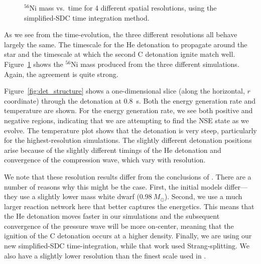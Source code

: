 \documentclass[preprint,linenumbers]{aastex631}
\newcommand{\isot}[2]{$^{#2}\mathrm{#1}$}
\begin{document}

\begin{figure}[t]
\centering
{}
\caption{\label{fig:res} \isot{Ni}{56} mass vs.\ time for 4 different spatial resolutions, using the simplified-SDC time integration method.}
\end{figure}

As we see from the time-evolution, the three different resolutions all
behave largely the same.  The timescale for the He detonation to
propagate around the star and the timescale at which the second C
detonation ignite match well.  Figure~\ref{fig:res} shows the
\isot{Ni}{56} mass produced from the three different simulations.
Again, the agreement is quite strong.



\begin{figure*}
\centering
{}
\caption{\label{fig:det_structure} Structure of the
C detonation at $t = 0.8~\mathrm{s}$ for the 3 different resolution runs.}
\end{figure*}

Figure~\ref{fig:det_structure} shows a one-dimensional
slice (along the horizontal, $r$ coordinate) through the detonation at 0.8~s.  Both the energy generation
rate and temperature are shown.  For the energy generation
rate, we see both positive and negative regions, indicating that we are attempting to find the NSE state as we evolve.  The temperature plot shows that the detonation
is very steep, particularly for the highest-resolution
simulations.  The slightly different detonation positions
arise because of the slightly different timings of the He detonation and convergence of the compression wave, which vary with resolution.


We note that these resolution results differ from the conclusions of
\citet{rivas:2022}.  There are a number of reasons why this might be
the case.  First, the initial models differ---they use a slightly lower mass white dwarf ($0.98~M_\odot$).  Second, we use a much larger reaction network here that better
captures the energetics.  This means that the He detonation moves
faster in our simulations and the subsequent convergence of the pressure wave will be
more on-center, meaning that the ignition of the C detonation occurs
at a higher density.  Finally, we are using our new simplified-SDC time-integration, while that work used Strang-splitting.
We also have a slightly lower resolution than the finest scale used in \citet{townsley:2019}.
\end{document}
